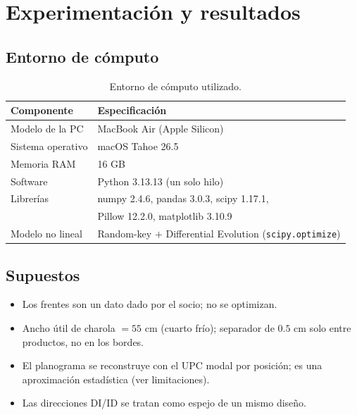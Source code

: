 \documentclass[11pt,letterpaper]{article}
\newcommand{\thead}[1]{\rowcolor{headgray}#1}
\begin{document}
\section{Experimentaci\'on y resultados}
\subsection{Entorno de c\'omputo}
\begin{table}[H]
\centering\small
\begin{tabular}{ll}
\toprule
\thead{\textbf{Componente}} & \textbf{Especificaci\'on} \\
\midrule
Modelo de la PC        & MacBook Air (Apple Silicon) \\
Sistema operativo      & macOS Tahoe 26.5 \\
Memoria RAM            & 16 GB \\
Software               & Python 3.13.13 (un solo hilo) \\
Librer\'ias            & numpy 2.4.6, pandas 3.0.3, scipy 1.17.1, \\
                       & Pillow 12.2.0, matplotlib 3.10.9 \\
Modelo no lineal       & Random-key $+$ Differential Evolution (\texttt{scipy.optimize}) \\
\bottomrule
\end{tabular}
\caption{Entorno de c\'omputo utilizado.}
\end{table}

\subsection{Supuestos}
\begin{itemize}[leftmargin=1.6em, itemsep=0.2em]
\item Los frentes son un dato dado por el socio; no se optimizan.
\item Ancho \'util de charola $=55$ cm (cuarto fr\'io); separador de $0.5$ cm solo
entre productos, no en los bordes.
\item El planograma se reconstruye con el UPC modal por posici\'on; es una
aproximaci\'on estad\'istica (ver limitaciones).
\item Las direcciones DI/ID se tratan como espejo de un mismo dise\~no.
\end{itemize}
\end{document}
